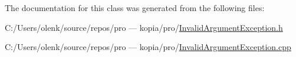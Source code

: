 The documentation for this class was generated from the following files\+:\begin{DoxyCompactItemize}
\item 
C\+:/\+Users/olenk/source/repos/pro — kopia/pro/\mbox{\hyperlink{_invalid_argument_exception_8h}{Invalid\+Argument\+Exception.\+h}}\item 
C\+:/\+Users/olenk/source/repos/pro — kopia/pro/\mbox{\hyperlink{_invalid_argument_exception_8cpp}{Invalid\+Argument\+Exception.\+cpp}}\end{DoxyCompactItemize}
